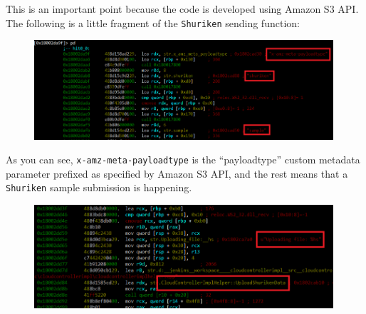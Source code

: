 This is an important point because the code is developed using Amazon S3
API\cite{AmazonS3RestApi}.
The following is a little fragment of the \texttt{Shuriken} sending function:
\begin{figure}[h]
  \centering
  \includegraphics[width=0.99\textwidth]{./figures/Shuriken}
\end{figure}

As you can see, \texttt{x-amz-meta-payloadtype} is the ``payloadtype'' custom
metadata parameter prefixed as specified by Amazon S3 API, and the rest means
that a \texttt{Shuriken} sample submission is happening.
\begin{figure}[h]
  \centering
  \includegraphics[width=0.99\textwidth]{./figures/Shuriken2}
\end{figure}

